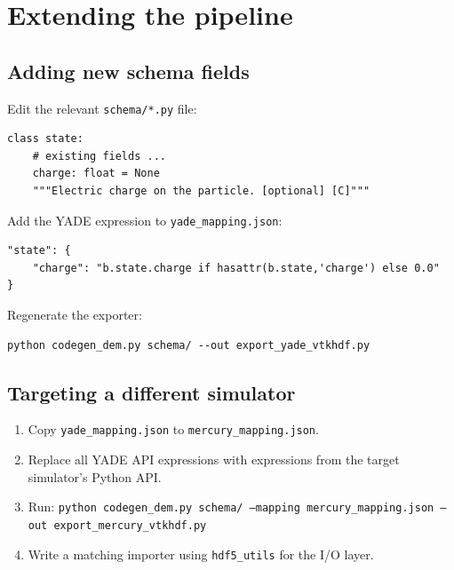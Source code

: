 \documentclass[11pt,a4paper]{article}
\begin{document}
\section{Extending the pipeline}
\label{sec:extending}

\subsection{Adding new schema fields}

Edit the relevant \texttt{schema/*.py} file:

\begin{lstlisting}
class state:
    # existing fields ...
    charge: float = None
    """Electric charge on the particle. [optional] [C]"""
\end{lstlisting}

Add the YADE expression to \texttt{yade\_mapping.json}:

\begin{lstlisting}[language={}]
"state": {
    "charge": "b.state.charge if hasattr(b.state,'charge') else 0.0"
}
\end{lstlisting}

Regenerate the exporter:

\begin{lstlisting}[style=bash]
python codegen_dem.py schema/ --out export_yade_vtkhdf.py
\end{lstlisting}

\subsection{Targeting a different simulator}

\begin{enumerate}[leftmargin=1.8em, itemsep=3pt]
  \item Copy \texttt{yade\_mapping.json} to \texttt{mercury\_mapping.json}.
  \item Replace all YADE API expressions with expressions from the target
    simulator's Python API.
  \item Run: \texttt{python codegen\_dem.py schema/ --mapping mercury\_mapping.json --out export\_mercury\_vtkhdf.py}
  \item Write a matching importer using \texttt{hdf5\_utils} for the I/O
    layer.
\end{enumerate}
\end{document}
